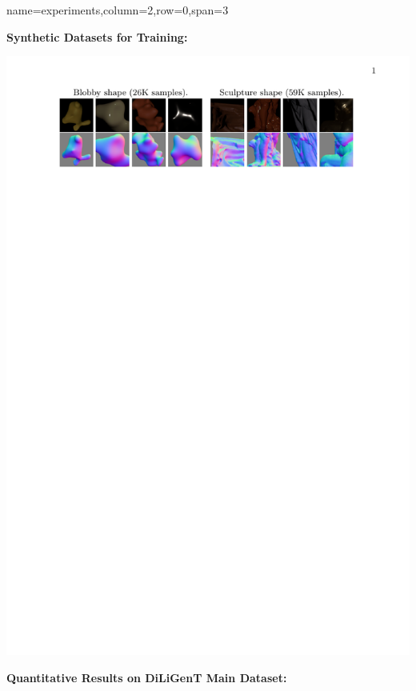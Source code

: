 {name=experiments,column=2,row=0,span=3}
{
    \begin{minipage}[t]{0.5\textwidth}
        \textbf{\color{sufered}Synthetic Datasets for Training:} 
        \vspace{-0.2em}
        \begin{center}
            \includegraphics[width=\textwidth]{images/datasets.pdf}
        \end{center}
    \end{minipage}
    \begin{minipage}[t]{0.5\textwidth}
        \textbf{\color{sufered}Quantitative Results on DiLiGenT Main Dataset:} 
        \vspace{-0.2em}
        \begin{center}

\end{center}
\end{minipage}}
